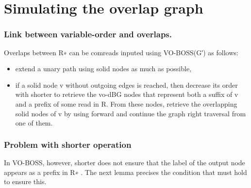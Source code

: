 \section{Simulating the overlap graph}



\begin{frame}
\frametitle{Link between variable-order and overlaps.}

Overlaps between R∗ can be comreads inputed using VO-BOSS(G′) as follows: 
\begin{itemize}
	
	\item extend a unary path using solid nodes as much as
	possible, 
	
	\item if a solid node v without outgoing edges is reached, then decrease its order with shorter to retrieve the vo-dBG nodes that represent both a suffix of v and a prefix of some read in R.
	From these nodes, retrieve the overlapping solid nodes of v by using forward and
	continue the graph right traversal from one of them.
\end{itemize}
\end{frame}

\begin{frame}
\frametitle{Problem with shorter operation}
In VO-BOSS, however, shorter does not ensure that the label of the output node appears
as a prefix in R∗
. The next lemma precises the condition that must hold to ensure this.

\end{frame}